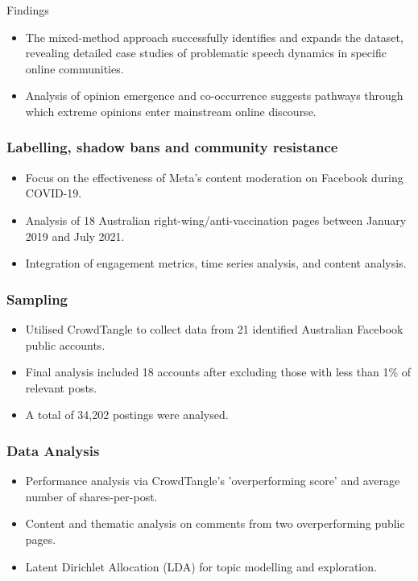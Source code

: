 \documentclass[serif, aspectratio=169]{beamer}
\begin{document}
\begin{frame}{Findings}
\begin{itemize}
  \item The mixed-method approach successfully identifies and expands the dataset, revealing detailed case studies of problematic speech dynamics in specific online communities.
  \item Analysis of opinion emergence and co-occurrence suggests pathways through which extreme opinions enter mainstream online discourse.
\end{itemize}
\end{frame}

\begin{frame}
\frametitle{Labelling, shadow bans and community resistance}
\begin{itemize}
    \item Focus on the effectiveness of Meta's content moderation on Facebook during COVID-19.
    \item Analysis of 18 Australian right-wing/anti-vaccination pages between January 2019 and July 2021.
    \item Integration of engagement metrics, time series analysis, and content analysis.
\end{itemize}
\end{frame}

\begin{frame}
\frametitle{Sampling}
\begin{itemize}
    \item Utilised CrowdTangle to collect data from 21 identified Australian Facebook public accounts.
    \item Final analysis included 18 accounts after excluding those with less than 1\% of relevant posts.
    \item A total of 34,202 postings were analysed.
\end{itemize}
\end{frame}

\begin{frame}
\frametitle{Data Analysis}
\begin{itemize}
    \item Performance analysis via CrowdTangle's 'overperforming score' and average number of shares-per-post.
    \item Content and thematic analysis on comments from two overperforming public pages.
    \item Latent Dirichlet Allocation (LDA) for topic modelling and exploration.
\end{itemize}
\end{frame}
\end{document}
